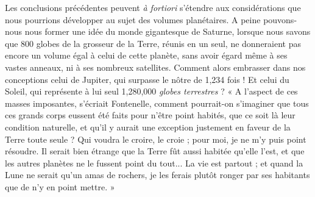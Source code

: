 \documentclass[a4paper, 11pt, oneside]{article}
\begin{document}
Les conclusions précédentes peuvent \emph{à fortiori} s'étendre aux considérations que nous pourrions développer au sujet des volumes planétaires. A peine pouvons-nous nous former une idée du monde gigantesque de Saturne, lorsque nous savons que 800 globes de la grosseur de la Terre, réunis en un seul, ne donneraient pas encore un volume égal à celui de cette planète, sans avoir égard même à ses vastes anneaux, ni à ses nombreux satellites. Comment alors embrasser dans nos conceptions celui de Jupiter, qui surpasse le nôtre de 1,234 fois ! Et celui du Soleil, qui représente à lui seul 1,280,000 \emph{globes terrestres} ? « A l'aspect de ces masses imposantes, s'écriait Fontenelle, comment pourrait-on s'imaginer que tous ces grands corps eussent été faits pour n'être point habités, que ce soit là leur condition naturelle, et qu'il y aurait une exception justement en faveur de la Terre toute seule ? Qui voudra le croire, le croie ; pour moi, je ne m'y puis point résoudre. Il serait bien étrange que la Terre fût aussi habitée qu'elle l'est, et que les autres planètes ne le fussent point du tout... La vie est partout ; et quand la Lune ne serait qu'un amas de rochers, je les ferais plutôt ronger par ses habitants que de n'y en point mettre. »
\end{document}
